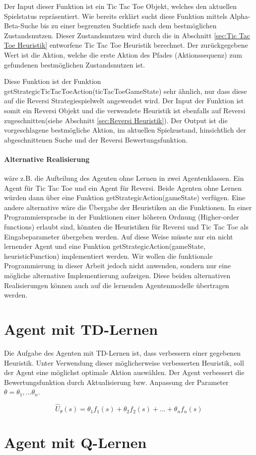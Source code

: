 Der Input dieser Funktion ist ein Tic Tac Toe Objekt, welches den aktuellen Spielstatus repräsentiert. Wie bereits erklärt sucht diese Funktion mittels Alpha-Beta-Suche bis zu einer begrenzten Suchtiefe nach dem bestmöglichen Zustandsnutzen. Dieser Zustandsnutzen wird durch die in Abschnitt \ref{sec:Tic Tac Toe Heuristik} entworfene Tic Tac Toe Heuristik berechnet. Der zurückgegebene Wert ist die Aktion, welche die erste Aktion des Pfades (Aktionssequenz) zum gefundenen bestmöglichen Zustandsnutzen ist.  

Diese Funktion ist der Funktion getStrategicTicTacToeAction(ticTacToeGameState) sehr ähnlich, nur dass diese auf die Reversi Strategiespielwelt angewendet wird. Der Input der Funktion ist somit ein Reversi Objekt und die verwendete Heuristik ist ebenfalls auf Reversi zugeschnitten(siehe Abschnitt \ref{sec:Reversi Heuristik}). Der Output ist die vorgeschlagene bestmögliche Aktion, im aktuellen Spielzustand, hinsichtlich der abgeschnittenen Suche und der Reversi Bewertungsfunktion.

\paragraph{Alternative Realisierung} wäre z.B. die Aufteilung des Agenten ohne Lernen in zwei Agentenklassen. Ein Agent für Tic Tac Toe und ein Agent für Reversi. Beide Agenten ohne Lernen würden dann über eine Funktion getStrategicAction(gameState) verfügen. Eine andere alternative wäre die Übergabe der Heuristiken an die Funktionen. In einer Programmiersprache in der Funktionen einer höheren Ordnung (Higher-order functions) erlaubt sind, könnten die Heuristiken für Reversi und Tic Tac Toe als Eingabeparameter übergeben werden. Auf diese Weise müsste nur ein nicht lernender Agent und eine Funktion getStrategicAction(gameState, heuristicFunction) implementiert werden. Wir wollen die funktionale Programmierung in dieser Arbeit jedoch nicht anwenden, sondern nur eine mögliche alternative Implementierung aufzeigen. Diese beiden alternativen Realisierungen können auch auf die lernenden Agentenmodelle übertragen werden.

\section{Agent mit TD-Lernen}
Die Aufgabe des Agenten mit TD-Lernen ist, dass verbessern einer gegebenen Heuristik. Unter Verwendung dieser möglicherweise verbesserten Heuristik, soll der Agent eine möglichst optimale Aktion auswählen. Der Agent verbessert die Bewertungsfunktion durch Aktualisierung bzw. Anpassung der Parameter $\theta = \theta_1, ... \theta_n$. 

\begin{equation*}
\hat{U}_\theta(s) = \theta_1 f_1(s) + \theta_2 f_2(s) + ... + \theta_n f_n(s)
\end{equation*}



\section{Agent mit Q-Lernen}


